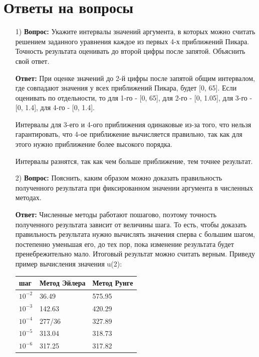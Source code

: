 \documentclass[14pt, a4paper]{extarticle}
\begin{document}
	\section*{Ответы на вопросы}
	\begin{enumerate}
		\item[1)] \textbf{Вопрос:} Укажите интервалы значений аргумента, в которых можно считать решением заданного уравнения каждое из первых 4-х приближений Пикара. Точность результата оценивать до
		второй цифры после запятой. Объяснить свой ответ.
			
		\textbf{Ответ:} При оценке значений до 2-й цифры после запятой общим интервалом, где совпадают значения у всех приближений Пикара, будет [0, 65]. Если оценивать по отдельности, то для 1-го - [0, 65], 
		для 2-го - [0, 1.05], для 3-го - [0, 1.4], для 4-го - [0, 1.4].
			
		Интервалы для 3-его и 4-ого приближения одинаковые из-за того, что
		нельзя гарантировать, что 4-ое приближение вычисляется правильно, так как для этого
		нужно приближение более высокого порядка.
		
		Интервалы разнятся, так как чем больше приближение, тем точнее результат.
		
		\item[2)] \textbf{Вопрос:} Пояснить, каким образом можно доказать правильность полученного результата при
		фиксированном значении аргумента в численных методах.
		
		\textbf{Ответ:} Численные методы работают пошагово, поэтому точность полученного результата зависит от величины шага. То есть, чтобы доказать правильность результата нужно вычислять значения сперва с большим шагом, постепенно уменьшая его, до тех пор, пока изменение результата будет пренебрежительно мало. Итоговый результат можно считать верным. Приведу пример вычисления значения u(2):
		\par
		\begin{table}[h]
			\begin{tabular}{|l|l|l|}\hline
				шаг    & Метод Эйлера  & Метод Рунге\\ \hline
				$10^{-2}$ & 36.49  & 575.95 \\
				$10^{-3}$ & 142.63  & 420.29 \\
				$10^{-4}$ & 277/36  & 327.89 \\
				$10^{-5}$ & 313.04  & 318.73 \\
				$10^{-6}$ & 317.25  & 317.82 \\
				\hline     
			\end{tabular}
		\end{table}
		

\end{enumerate}
\end{document}
